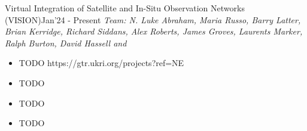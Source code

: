 \begin{projects}

\project
	{Virtual Integration of Satellite and In-Situ Observation Networks (VISION)}{Jan'24 - Present}
	{
	    \textit{Team: N. Luke Abraham, Maria Russo, Barry Latter, Brian Kerridge, Richard Siddans, Alex Roberts, James Groves, Laurents Marker, Ralph Burton, David Hassell and \underline{}}
	}
	{\begin{itemize}
	\setlength\itemsep{0.3em}
     \item TODO https://gtr.ukri.org/projects?ref=NE%
     \item TODO
     \item TODO
     \item TODO
     \end{itemize}}
     

\end{projects}
